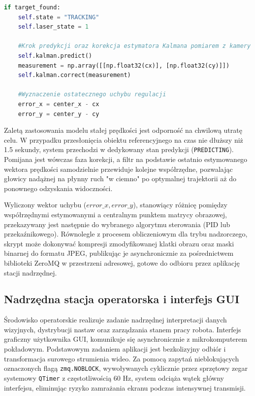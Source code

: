 \documentclass[a4paper,twoside,12pt]{book}
\begin{document}
\begin{lstlisting}[language=Python, basicstyle=\ttfamily\small, frame=single, breaklines=true]
if target_found:
    self.state = "TRACKING"
    self.laser_state = 1
    
    #Krok predykcji oraz korekcja estymatora Kalmana pomiarem z kamery
    self.kalman.predict()
    measurement = np.array([[np.float32(cx)], [np.float32(cy)]])
    self.kalman.correct(measurement)
    
    #Wyznaczenie ostatecznego uchybu regulacji
    error_x = center_x - cx
    error_y = center_y - cy
\end{lstlisting}

Zaletą zastosowania modelu stałej prędkości jest odporność na chwilową utratę celu. W przypadku przesłonięcia obiektu referencyjnego na czas nie dłuższy niż 1.5 sekundy, system przechodzi w dedykowany stan predykcji (\texttt{PREDICTING}). Pomijana jest wówczas faza korekcji, a filtr na podstawie ostatnio estymowanego wektora prędkości samodzielnie przewiduje kolejne współrzędne, pozwalając głowicy nadążnej na płynny ruch "w ciemno" po optymalnej trajektorii aż do ponownego odzyskania widoczności.

Wyliczony wektor uchybu ($error\_x, error\_y$), stanowiący różnicę pomiędzy współrzędnymi estymowanymi a centralnym punktem matrycy obrazowej, przekazywany jest następnie do wybranego algorytmu sterowania (PID lub przekaźnikowego). Równolegle z procesem obliczeniowym dla trybu nadzorczego, skrypt może dokonywać kompresji zmodyfikowanej klatki obrazu oraz maski binarnej do formatu JPEG, publikując je asynchronicznie za pośrednictwem biblioteki ZeroMQ w przestrzeni adresowej, gotowe do odbioru przez aplikację stacji nadrzędnej.

\subsection{Nadrzędna stacja operatorska i interfejs GUI}
Środowisko operatorskie realizuje zadanie nadrzędnej interpretacji danych wizyjnych, dystrybucji nastaw oraz zarządzania stanem pracy robota. Interfejs graficzny użytkownika GUI, komunikuje się asynchronicznie z mikrokomputerem pokładowym. Podstawowym zadaniem aplikacji jest bezkolizyjny odbiór i transformacja surowego strumienia wideo. Za pomocą zapytań nieblokujących oznaczonych flagą \texttt{zmq.NOBLOCK}, wywoływanych cyklicznie przez sprzętowy zegar systemowy \texttt{QTimer} z częstotliwością 60 Hz, system odciąża wątek główny interfejsu, eliminując ryzyko zamrażania ekranu podczas intensywnej transmisji.
\end{document}
